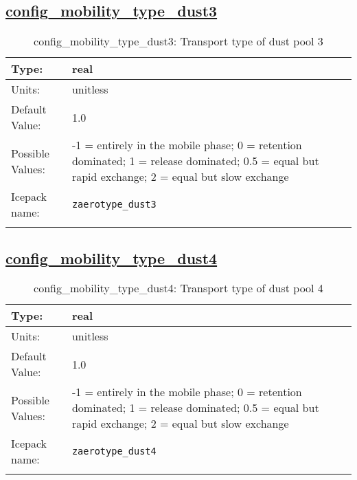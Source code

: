 \subsection[config\_mobility\_type\_dust3]{\hyperref[sec:nm_tab_biogeochemistry]{config\_mobility\_type\_dust3}}
\label{subsec:nm_sec_config_mobility_type_dust3}
\begin{center}
\begin{longtable}{| p{2.0in} || p{4.0in} |}
    \hline
    Type: & real \\
    \hline
    Units: & \si{unitless} \\
    \hline
    Default Value: & 1.0 \\
    \hline
    Possible Values: & -1 = entirely in the mobile phase; 0 = retention dominated; 1 = release dominated; 0.5 = equal but rapid exchange; 2 = equal but slow exchange \\
    \hline
    Icepack name: & \verb+zaerotype_dust3+ \\
    \hline
    \caption{config\_mobility\_type\_dust3: Transport type of dust pool 3}
\end{longtable}
\end{center}
\subsection[config\_mobility\_type\_dust4]{\hyperref[sec:nm_tab_biogeochemistry]{config\_mobility\_type\_dust4}}
\label{subsec:nm_sec_config_mobility_type_dust4}
\begin{center}
\begin{longtable}{| p{2.0in} || p{4.0in} |}
    \hline
    Type: & real \\
    \hline
    Units: & \si{unitless} \\
    \hline
    Default Value: & 1.0 \\
    \hline
    Possible Values: & -1 = entirely in the mobile phase; 0 = retention dominated; 1 = release dominated; 0.5 = equal but rapid exchange; 2 = equal but slow exchange \\
    \hline
    Icepack name: & \verb+zaerotype_dust4+ \\
    \hline
    \caption{config\_mobility\_type\_dust4: Transport type of dust pool 4}
\end{longtable}
\end{center}
